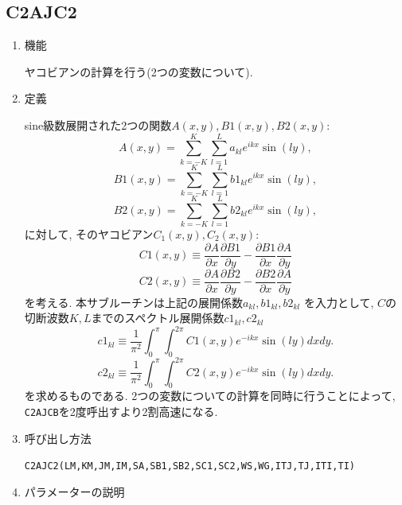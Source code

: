 \documentclass[a4j,fleqn]{jarticle}
\begin{document}

\subsection{C2AJC2}

\begin{enumerate}

\item 機能 

ヤコビアンの計算を行う(2つの変数について).

\item 定義

sine級数展開された2つの関数$A(x,y),B1(x,y),B2(x,y)$:
\[
A(x,y)=\sum^K_{k=-K}\sum^L_{l=1}a_{kl}e^{ikx}\sin(ly),
\]
\[
B1(x,y)=\sum^K_{k=-K}\sum^L_{l=1}b1_{kl}e^{ikx}\sin(ly),
\]
\[
B2(x,y)=\sum^K_{k=-K}\sum^L_{l=1}b2_{kl}e^{ikx}\sin(ly),
\]
に対して, そのヤコビアン$C_1(x,y),C_2(x,y)$:
\[
C1(x,y)\equiv
\frac{\partial A}{\partial x}\frac{\partial B1}{\partial y}
-\frac{\partial B1}{\partial x}\frac{\partial A}{\partial y}
\]
\[
C2(x,y)\equiv
\frac{\partial A}{\partial x}\frac{\partial B2}{\partial y}
-\frac{\partial B2}{\partial x}\frac{\partial A}{\partial y}
\]
を考える. 本サブルーチンは上記の展開係数$a_{kl},b1_{kl},b2_{kl}$
を入力として,
$C$の切断波数$K,L$までのスペクトル展開係数$c1_{kl},c2_{kl}$
\[
c1_{kl}\equiv\frac1{\pi^2}\int^{\pi}_0\int^{2\pi}_0
C1(x,y)e^{-ikx}\sin(ly)dxdy.
\]
\[
c2_{kl}\equiv\frac1{\pi^2}\int^{\pi}_0\int^{2\pi}_0
C2(x,y)e^{-ikx}\sin(ly)dxdy.
\]
を求めるものである. 2つの変数についての計算を同時に行うことによって,
{\tt C2AJCB}を2度呼出すより2割高速になる.

\item 呼び出し方法 

{\tt C2AJC2(LM,KM,JM,IM,SA,SB1,SB2,SC1,SC2,WS,WG,ITJ,TJ,ITI,TI)}
  
\item パラメーターの説明


\end{enumerate}
\end{document}
